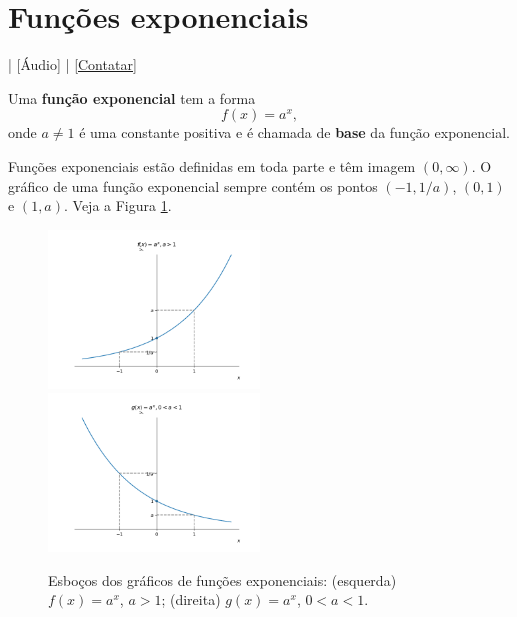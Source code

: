 \section{Funções exponenciais}\label{cap_funcao_sec_funexp}

\begin{flushright}
  [Vídeo] | [Áudio] | \href{https://phkonzen.github.io/notas/contato.html}{[Contatar]}
\end{flushright}

Uma {\bf função exponencial} tem a forma
\begin{equation}
  f(x) = a^x,
\end{equation}
onde $a\neq 1$ é uma constante positiva e é chamada de {\bf base} da função exponencial.

Funções exponenciais estão definidas em toda parte e têm imagem $(0, \infty)$. O gráfico de uma função exponencial sempre contém os pontos $(-1,1/a)$, $(0,1)$ e $(1,a)$. Veja a Figura \ref{fig:exponencial_graficos}.

\begin{figure}[H]
  \centering
  \includegraphics[width=0.5\textwidth]{./cap_funcao/dados/fig_exponencial_graficos/fig_exponencial_2}~
  \includegraphics[width=0.5\textwidth]{./cap_funcao/dados/fig_exponencial_graficos/fig_exponencial_12}
  \caption{Esboços dos gráficos de funções exponenciais: (esquerda) $f(x) = a^x$, $a>1$; (direita) $g(x) = a^x$, $0<a<1$.}
  \label{fig:exponencial_graficos}
\end{figure}

